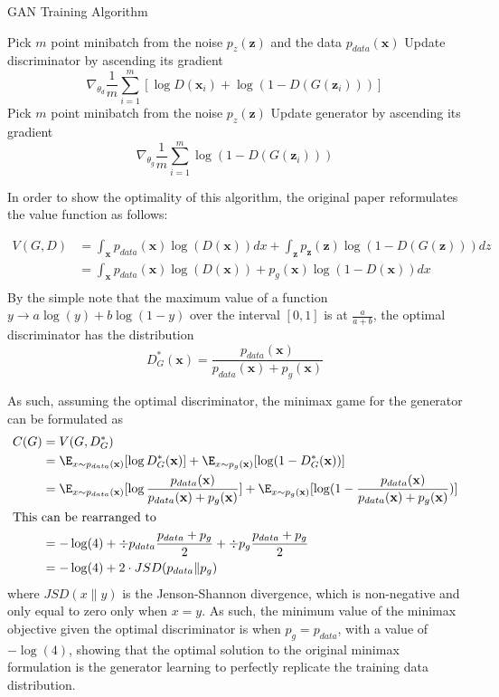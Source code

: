 \begin{algorithm}
\caption{GAN Training Algorithm}
\begin{algorithmic}
\STATE Pick $m$ point minibatch from the noise $p_z(\mathbf{z})$ and the data $p_{data}(\mathbf{x})$
\STATE Update discriminator by ascending its gradient
$$\nabla_{\theta_d} \frac{1}{m} \sum_{i=1}^m \left[\log{D\left(\mathbf{x}_i\right)} + \log(1-D\left(G\left(\mathbf{z}_i\right)\right))\right]$$
\ENDFOR
\STATE Pick $m$ point minibatch from the noise $p_z(\mathbf{z})$
\STATE Update generator by ascending its gradient
$$\nabla_{\theta_g} \frac{1}{m} \sum_{i=1}^m \log(1-D\left(G\left(\mathbf{z}_i\right)\right))$$
\ENDFOR
\end{algorithmic}
\end{algorithm}

In order to show the optimality of this algorithm, the original paper reformulates the value function as follows:

\begin{align*}
    V(G,D) &= \int_\mathbf{x} p_{data}(\mathbf{x})\log(D(\mathbf{x})) dx + \int_\mathbf{z} p_\mathbf{z}(\mathbf{z})\log(1-D(G(\mathbf{z}))) dz \\
    &= \int_\mathbf{x} p_{data}(\mathbf{x})\log(D(\mathbf{x})) + p_g(\mathbf{x})\log(1-D(\mathbf{x})) dx \\
\end{align*}
By the simple note that the maximum value of a function $y \rightarrow a\log(y) + b\log(1-y)$ over the interval $[0,1]$ is at $\frac{a}{a+b}$, the optimal discriminator has the distribution
$$D^*_G(\mathbf{x}) = \frac{p_{data}(\mathbf{x})}{p_{data}(\mathbf{x}) + p_{g}(\mathbf{x})}$$

As such, assuming the optimal discriminator, the minimax game for the generator can be formulated as
\begin{align*}
    C(G) &= V(G,D^*_G) \\
    &= \E_{x \sim p_{data}(\mathbf{x})}[\log{D^*_G(\mathbf{x})}] + \E_{x \sim p_{g}(\mathbf{x})} [\log(1 - D^*_G(\mathbf{x}))] \\
    &= \E_{x \sim p_{data}(\mathbf{x})}[\log{\frac{p_{data}(\mathbf{x})}{p_{data}(\mathbf{x}) + p_{g}(\mathbf{x})}}] + \E_{x \sim p_{g}(\mathbf{x})} [\log(1 - \frac{p_{data}(\mathbf{x})}{p_{data}(\mathbf{x}) + p_{g}(\mathbf{x})})] \\
    \intertext{This can be rearranged to}
    &= -\log(4) + \div{p_{data}}{\frac{p_{data}+p_g}{2}} + \div{p_{g}}{\frac{p_{data}+p_g}{2}} \\
    & = -\log(4) + 2\cdot JSD(p_{data} \| p_g)
\end{align*}
where $JSD(x\|y)$ is the Jenson-Shannon divergence, which is non-negative and only equal to zero only when $x =y$. As such, the minimum value of the minimax objective given the optimal discriminator is when $p_g = p_{data}$, with a value of $-\log(4)$, showing that the optimal solution to the original minimax formulation is the generator learning to perfectly replicate the training data distribution.
